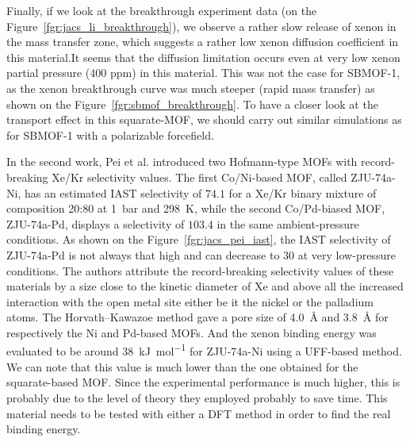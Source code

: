\documentclass[main]{subfiles}
\begin{document}
Finally, if we look at the breakthrough experiment data (on the Figure~\ref{fgr:jacs_li_breakthrough}), we observe a rather slow release of xenon in the mass transfer zone, which suggests a rather low xenon diffusion coefficient in this material.It seems that the diffusion limitation occurs even at very low xenon partial pressure (400 ppm) in this material. This was not the case for SBMOF-1, as the xenon breakthrough curve was much steeper (rapid mass transfer) as shown on the Figure~\ref{fgr:sbmof_breakthrough}. To have a closer look at the transport effect in this squarate-MOF, we should carry out similar simulations as for SBMOF-1 with a polarizable forcefield. 

In the second work,\autocite{Pei_2022} Pei et al. introduced two Hofmann-type MOFs with record-breaking Xe/Kr selectivity values. The first Co/Ni-based MOF, called ZJU-74a-Ni, has an estimated IAST selectivity of $74.1$ for a Xe/Kr binary mixture of composition 20:80 at \SI{1}{\bar} and \SI{298}{\kelvin}, while the second Co/Pd-biased MOF, ZJU-74a-Pd, displays a selectivity of $103.4$ in the same ambient-pressure conditions. As shown on the Figure~\ref{fgr:jacs_pei_iast}, the IAST selectivity of ZJU-74a-Pd is not always that high and can decrease to $30$ at very low-pressure conditions. The authors attribute the record-breaking selectivity values of these materials by a size close to the kinetic diameter of Xe and above all the increased interaction with the open metal site either be it the nickel or the palladium atoms. The Horvath–Kawazoe method gave a pore size of \SI{4.0}{\angstrom} and \SI{3.8}{\angstrom} for respectively the Ni and Pd-based MOFs. And the xenon binding energy was evaluated to be around \SI{38}{\kJ\per\mole} for ZJU-74a-Ni using a UFF-based method. We can note that this value is much lower than the one obtained for the squarate-based MOF. Since the experimental performance is much higher, this is probably due to the level of theory they employed probably to save time. This material needs to be tested with either a DFT method in order to find the real binding energy. 
\end{document}
